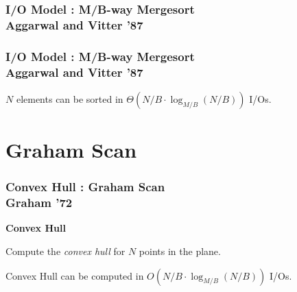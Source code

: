\documentclass[english, aspectratio=169]{beamer}
\begin{document}
\begin{frame}
  \frametitle{I/O Model : M/B-way Mergesort\\Aggarwal and Vitter '87}

  
\end{frame}

\begin{frame}
  \frametitle{I/O Model : M/B-way Mergesort\\Aggarwal and Vitter '87}

  { \Large%
    \begin{theorem}
      $N$ elements can be sorted in $\Theta(N/B \cdot \log_{M/B}(N/B))$ I/Os.
    \end{theorem}
  }
\end{frame}

\section{Graham Scan}

\blankframe

\begin{frame}
  \frametitle{Convex Hull : Graham Scan\\Graham '72}

  \textbf{Convex Hull}

  Compute the \emph{convex hull} for $N$ points in the plane.

  \begin{figure}
    \centering

    \begin{tikzpicture}[scale=1.6]
      
    \end{tikzpicture}
  \end{figure}

  \begin{theorem}
    Convex Hull can be computed in $O(N/B \cdot \log_{M/B}(N/B))$ I/Os.
  \end{theorem}
\end{frame}
\end{document}
